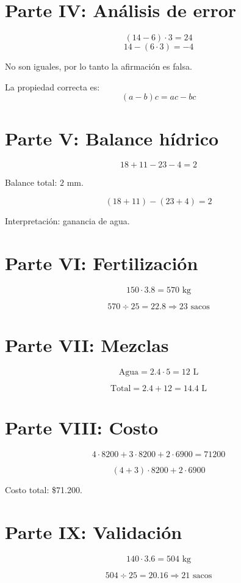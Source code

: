 \documentclass[12pt]{article}
\begin{document}
	\section*{Parte IV: Análisis de error}
	
	\[
	(14-6)\cdot3 = 24
	\]
	\[
	14-(6\cdot3) = -4
	\]
	
	No son iguales, por lo tanto la afirmación es falsa.
	
	La propiedad correcta es:
	\[
	(a-b)c = ac - bc
	\]
	
	\section*{Parte V: Balance hídrico}
	
	\[
	18 + 11 - 23 - 4 = 2
	\]
	
	Balance total: $2$ mm.
	
	\[
	(18+11)-(23+4)=2
	\]
	
	Interpretación: ganancia de agua.
	
	\section*{Parte VI: Fertilización}
	
	\[
	150 \cdot 3.8 = 570 \text{ kg}
	\]
	
	\[
	570 \div 25 = 22.8 \Rightarrow 23 \text{ sacos}
	\]
	
	\section*{Parte VII: Mezclas}
	
	\[
	\text{Agua} = 2.4 \cdot 5 = 12 \text{ L}
	\]
	
	\[
	\text{Total} = 2.4 + 12 = 14.4 \text{ L}
	\]
	
	\section*{Parte VIII: Costo}
	
	\[
	4\cdot8200 + 3\cdot8200 + 2\cdot6900 = 71200
	\]
	
	\[
	(4+3)\cdot8200 + 2\cdot6900
	\]
	
	Costo total: \$71.200.
	
	\section*{Parte IX: Validación}
	
	\[
	140 \cdot 3.6 = 504 \text{ kg}
	\]
	
	\[
	504 \div 25 = 20.16 \Rightarrow 21 \text{ sacos}
	\]
	
\end{document}
